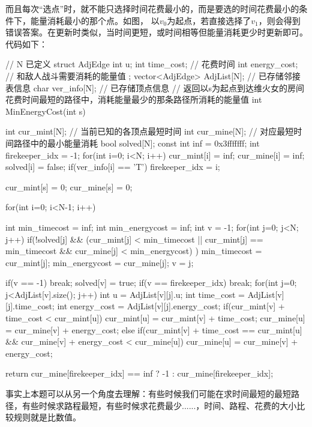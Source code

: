 而且每次“选点”时，就不能只选择时间花费最小的，而是要选的时间花费最小的条件下，能量消耗最小的那个点。如图，
以$v_0$为起点，若直接选择了$v_1$，则会得到错误答案。在更新时类似，当时间更短，或时间相等但能量消耗更少时更新即可。代码如下：

\begin{cppcodeHighlight}[11-12,17-18,29-30,32-39,53-59]
    // N 已定义
    struct AdjEdge {
        int u;
        int time_cost;      // 花费时间
        int energy_cost;    // 和敌人战斗需要消耗的能量值
    };
    vector<AdjEdge> AdjList[N];    // 已存储邻接表信息
    char ver_info[N];   // 已存储顶点信息
    // 返回以s为起点到达维火女的房间花费时间最短的路径中，消耗能量最少的那条路径所消耗的能量值
    int MinEnergyCost(int s) {
        int cur_mint[N];    // 当前已知的各顶点最短时间
        int cur_mine[N];    // 对应最短时间路径中的最小能量消耗
        bool solved[N];
        const int inf = 0x3fffffff;
        int firekeeper_idx = -1;
        for(int i=0; i<N; i++) {
            cur_mint[i] = inf;
            cur_mine[i] = inf;
            solved[i] = false;
            if(ver_info[i] == 'T') {
                firekeeper_idx = i;
            }
        }

        cur_mint[s] = 0;
        cur_mine[s] = 0;

        for(int i=0; i<N-1; i++) {
            int min_timecost = inf;
            int min_energycost = inf;
            int v = -1;
            for(int j=0; j<N; j++) {
                if(!solved[j] && (cur_mint[j] < min_timecost ||
                    cur_mint[j] == min_timecost && cur_mine[j] < min_energycost)
                ) {
                    min_timecost = cur_mint[j];
                    min_energycost = cur_mine[j];
                    v = j;
                }
            }

            if(v == -1) {
                break;
            }
            solved[v] = true;
            if(v == firekeeper_idx) {
                break;
            }
            for(int j=0; j<AdjList[v].size(); j++) {
                int u = AdjList[v][j].u;
                int time_cost = AdjList[v][j].time_cost;
                int energy_cost = AdjList[v][j].energy_cost;
                if(cur_mint[v] + time_cost < cur_mint[u]) {
                    cur_mint[u] = cur_mint[v] + time_cost;
                    cur_mine[u] = cur_mine[v] + energy_cost;
                }
                else if(cur_mint[v] + time_cost == cur_mint[u] && cur_mine[v] + energy_cost < cur_mine[u]) {
                    cur_mine[u] = cur_mine[v] + energy_cost;
                }
            }
        }
        return cur_mine[firekeeper_idx] == inf ? -1 : cur_mine[firekeeper_idx];
    }
\end{cppcodeHighlight}
事实上本题可以从另一个角度去理解：有些时候我们可能在求时间最短的最短路径，有些时候求路程最短，有些时候求花费最少......，时间、路程、花费的大小比较规则就是比数值。

